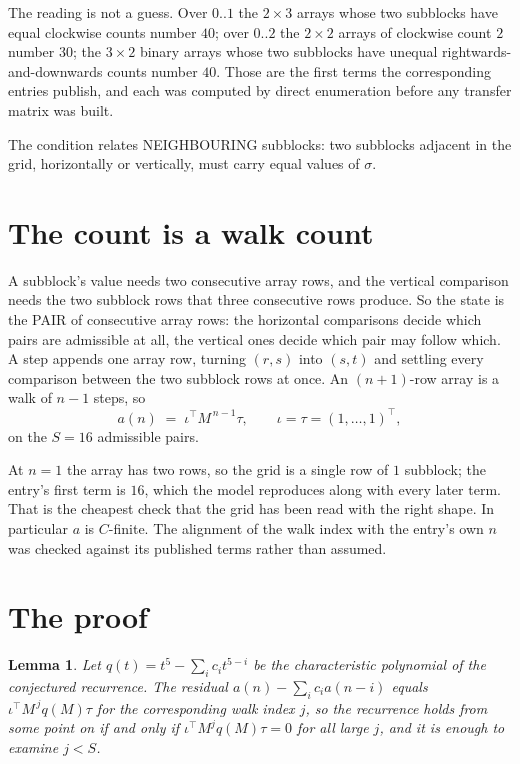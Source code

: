 \documentclass[11pt,a4paper]{article}
\theoremstyle{plain}
\newtheorem{lemma}[theorem]{Lemma}
\theoremstyle{definition}
\begin{document}
The reading is not a guess. Over $0..1$ the $2\times3$ arrays whose two subblocks have equal
clockwise counts number $40$; over $0..2$ the $2\times2$ arrays of clockwise count $2$ number
$30$; the $3\times2$ binary arrays whose two subblocks have unequal rightwards-and-downwards
counts number $40$. Those are the first terms the corresponding entries publish, and each was
computed by direct enumeration before any transfer matrix was built.

The condition relates NEIGHBOURING subblocks: two subblocks adjacent in the grid, horizontally
or vertically, must carry equal values of $\sigma$.

\section{The count is a walk count}

A subblock's value needs two consecutive array rows, and the vertical
comparison needs the two subblock rows that three consecutive rows produce. So the state is the
PAIR of consecutive array rows: the horizontal comparisons decide which pairs are admissible at
all, the vertical ones decide which pair may follow which. A step appends one array row,
turning $(r,s)$ into $(s,t)$ and settling every comparison between the two subblock rows at
once. An $(n+1)$-row array is a walk of $n-1$ steps, so
\[
a(n)\;=\;\iota^{\!\top}M^{\,n-1}\tau,\qquad\iota=\tau=(1,\dots,1)^{\!\top},
\]
on the $S=16$ admissible pairs.

At $n=1$ the array has two rows, so the grid is a single row of $1$
subblock; the entry's first term is $16$, which the model
reproduces along with every later term. That is the cheapest check that the grid has been read
with the right shape.
In particular $a$ is $C$-finite. The alignment of the walk index with the entry's own $n$ was
checked against its published terms rather than assumed.

\section{The proof}

\begin{lemma}\label{lem:crit}
Let $q(t)=t^{5}-\sum_i c_it^{5-i}$ be the characteristic polynomial of the
conjectured recurrence. The residual $a(n)-\sum_ic_ia(n-i)$ equals
$\iota^{\!\top}M^{\,j}q(M)\tau$ for the corresponding walk index $j$, so the recurrence
holds from some point on if and only if $\iota^{\!\top}M^{j}q(M)\tau=0$ for all large $j$,
and it is enough to examine $j<S$.
\end{lemma}
\end{document}
